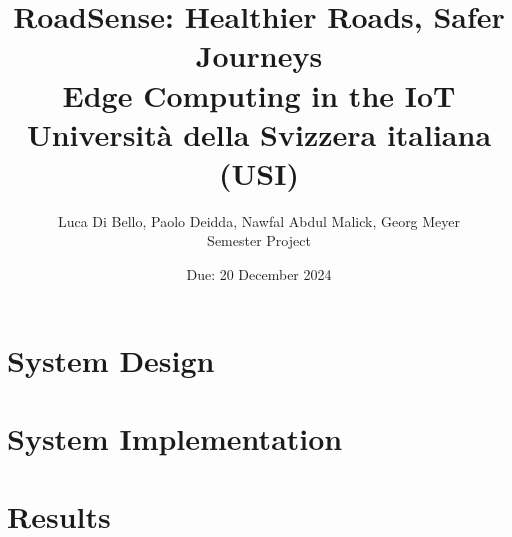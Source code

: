 \documentclass[12pt,a4paper]{report}
\title{RoadSense: Healthier Roads, Safer Journeys \\ \vspace{0.5em}
\Large Edge Computing in the IoT \\ Università della Svizzera italiana (USI)}
\author{Luca Di Bello, Paolo Deidda, Nawfal Abdul Malick, Georg Meyer \\[1em]
Semester Project}
\date{Due: 20 December 2024}
\begin{document}
\maketitle

\tableofcontents
\listoffigures

\chapter{System Design}





\chapter{System Implementation}







\chapter{Results}




\end{document}
